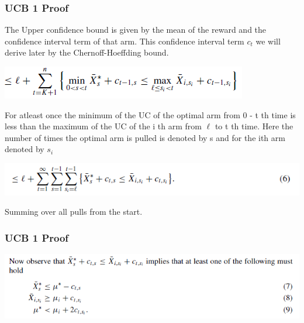 \documentclass{beamer}
\begin{document}
\begin{frame}
\frametitle{UCB 1 Proof}
The Upper confidence bound is given by the mean of the reward and the confidence interval term of that arm. This confidence interval term $c_{t}$ we will derive later by the Chernoff-Hoeffding bound.

\begin{tabbing}
\hspace*{.25in}
\includegraphics[scale=0.7]{img/line4.png}
\end{tabbing}

For atleast once the minimum of the UC of the optimal arm from 0 - t th time is less than the maximum of the UC of the i th arm from $\ell$ to t th time. Here the number of times the optimal arm is pulled is denoted by s and for the ith arm denoted by $s_{i}$

\begin{tabbing}
\hspace*{.25in}
\includegraphics[scale=0.7]{img/line5.png}
\end{tabbing}

Summing over all pulls from the start. 
\end{frame}

\begin{frame}
\frametitle{UCB 1 Proof}
\begin{tabbing}
\includegraphics[scale=0.7]{img/observe.png}
\end{tabbing}

\end{frame}

\end{document}
